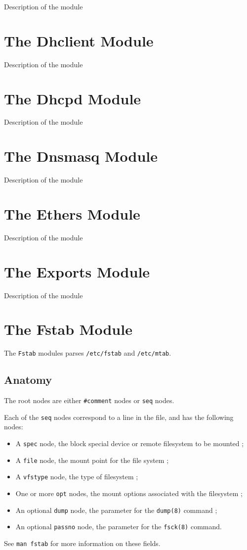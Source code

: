 Description of the module

\section{The Dhclient Module}

Description of the module

\section{The Dhcpd Module}

Description of the module

\section{The Dnsmasq Module}

Description of the module

\section{The Ethers Module}

Description of the module

\section{The Exports Module}

Description of the module

\section{The Fstab Module}

The \verb!Fstab! modules parses \verb!/etc/fstab! and \verb!/etc/mtab!.

\subsection{Anatomy}

The root nodes are either \verb!#comment! nodes or \verb!seq! nodes.

Each of the \verb!seq! nodes correspond to a line in the file, and has the following nodes:

\begin{itemize}
\item
  A \verb!spec! node, the block special device or remote filesystem to be mounted ;
\item
  A \verb!file! node, the mount point for the file system ;
\item
  A \verb!vfstype! node, the type of filesystem ;
\item
  One or more \verb!opt! nodes, the mount options associated with the filesystem ;
\item
  An optional \verb!dump! node, the parameter for the \verb!dump(8)! command ;
\item
  An optional \verb!passno! node, the parameter for the \verb!fsck(8)! command.
\end{itemize}
See \verb!man fstab! for more information on these fields.

